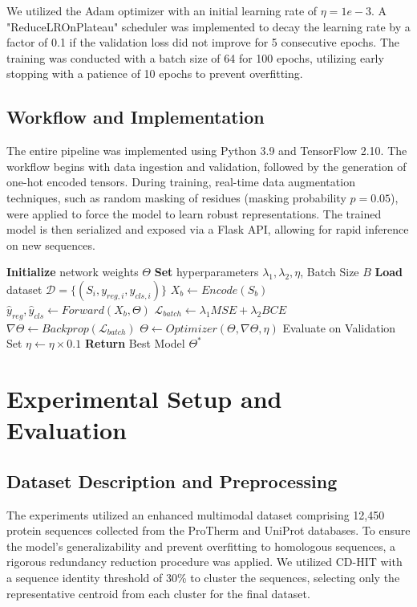 \documentclass[conference]{IEEEtran}
\begin{document}
We utilized the Adam optimizer with an initial learning rate of $\eta = 1e-3$. A "ReduceLROnPlateau" scheduler was implemented to decay the learning rate by a factor of 0.1 if the validation loss did not improve for 5 consecutive epochs. The training was conducted with a batch size of 64 for 100 epochs, utilizing early stopping with a patience of 10 epochs to prevent overfitting.

\subsection{Workflow and Implementation}
The entire pipeline was implemented using Python 3.9 and TensorFlow 2.10. The workflow begins with data ingestion and validation, followed by the generation of one-hot encoded tensors. During training, real-time data augmentation techniques, such as random masking of residues (masking probability $p=0.05$), were applied to force the model to learn robust representations. The trained model is then serialized and exposed via a Flask API, allowing for rapid inference on new sequences.
\begin{algorithm}
\caption{Multiscale CNN Training Procedure}
\begin{algorithmic}[1]
\STATE \textbf{Initialize} network weights $\Theta$
\STATE \textbf{Set} hyperparameters $\lambda_1, \lambda_2, \eta$, Batch Size $B$
\STATE \textbf{Load} dataset $\mathcal{D} = \{(S_i, y_{reg,i}, y_{cls,i})\}$
        \STATE $X_b \leftarrow Encode(S_b)$
        \STATE $\hat{y}_{reg}, \hat{y}_{cls} \leftarrow Forward(X_b, \Theta)$
        \STATE $\mathcal{L}_{batch} \leftarrow \lambda_1 MSE + \lambda_2 BCE$
        \STATE $\nabla \Theta \leftarrow Backprop(\mathcal{L}_{batch})$
        \STATE $\Theta \leftarrow Optimizer(\Theta, \nabla \Theta, \eta)$
    \ENDFOR
    \STATE Evaluate on Validation Set
        \STATE $\eta \leftarrow \eta \times 0.1$
    \ENDIF
\ENDFOR
\STATE \textbf{Return} Best Model $\Theta^*$
\end{algorithmic}
\end{algorithm}

\section{Experimental Setup and Evaluation}
\subsection{Dataset Description and Preprocessing}
The experiments utilized an enhanced multimodal dataset comprising 12,450 protein sequences collected from the ProTherm and UniProt databases. To ensure the model's generalizability and prevent overfitting to homologous sequences, a rigorous redundancy reduction procedure was applied. We utilized CD-HIT with a sequence identity threshold of 30\% to cluster the sequences, selecting only the representative centroid from each cluster for the final dataset. 
\end{document}
